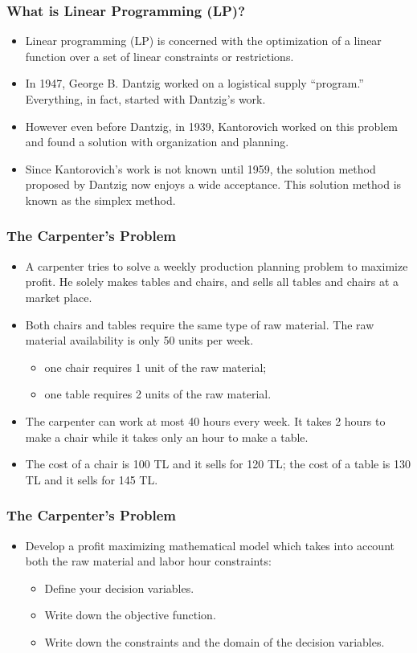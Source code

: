 \documentclass[11pt]{beamer}
\begin{document}
\begin{frame}
\frametitle{What is Linear Programming (LP)?}
\begin{itemize}
\item Linear programming (LP) is concerned with the optimization of a linear function over a set of linear constraints or restrictions.
\item In 1947, George B. Dantzig worked on a logistical supply “program.” Everything, in fact, started with Dantzig’s work.
\item However even before Dantzig, in 1939, Kantorovich worked on this problem and found a solution with organization and planning.
\item Since Kantorovich’s work is not known until 1959, the solution method proposed by Dantzig now enjoys a wide acceptance. This solution method is known as the simplex method.
\end{itemize}

\end{frame}

\begin{frame}
\frametitle{The Carpenter’s Problem}
\begin{itemize}
\item A carpenter tries to solve a weekly production planning problem to maximize profit.  He solely makes tables and chairs, and sells all tables and chairs at a market place.
\item Both chairs and tables require the same type of raw material.  The raw material availability is only 50 units per week.
\begin{itemize}
\item one chair requires 1 unit of the raw material;
\item one table requires 2 units of the raw material.
\end{itemize}
\item The carpenter can work at most 40 hours every week. It takes 2 hours to make a chair while it takes only an hour to make a table.
\item The cost of a chair is 100 TL and it sells for 120 TL; the cost of a table is 130 TL and it sells for 145 TL.
\end{itemize}

\end{frame}


\begin{frame}
\frametitle{The Carpenter’s Problem}
\begin{itemize}
\item Develop a profit maximizing mathematical model which takes into account both the raw material and labor hour constraints:
\begin{itemize}
\item Define your decision variables.
\item Write down the objective function.
\item Write down the constraints and the domain of the decision variables.
\end{itemize}
\end{itemize}

\end{frame}
\end{document}
